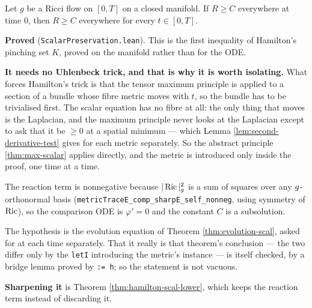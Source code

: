 \begin{theorem}
  \label{thm:scal-lower-bound-preserved}
  \leanok
  Let $g$ be a Ricci flow on $[0,T]$ on a closed manifold. If $R \ge C$ everywhere at
  time $0$, then $R \ge C$ everywhere for every $t \in [0,T]$.

  \textbf{Proved} (\texttt{ScalarPreservation.lean}). This is the first inequality of
  Hamilton's pinching set $K$, proved on the manifold rather than for the ODE.

  \textbf{It needs no Uhlenbeck trick, and that is why it is worth isolating.} What
  forces Hamilton's trick is that the tensor maximum principle is applied to a section
  of a bundle whose fibre metric moves with $t$, so the bundle has to be trivialised
  first. The scalar equation has no fibre at all: the only thing that moves is the
  Laplacian, and the maximum principle never looks at the Laplacian except to ask that
  it be $\ge 0$ at a spatial minimum --- which Lemma \ref{lem:second-derivative-test}
  gives for each metric separately. So the abstract principle
  \ref{thm:max-scalar} applies directly, and the metric is introduced only inside the
  proof, one time at a time.

  The reaction term is nonnegative because $|\operatorname{Ric}|^2_g$ is a sum of squares over any
  $g$-orthonormal basis (\texttt{metricTraceE\_comp\_sharpE\_self\_nonneg}, using
  symmetry of $\operatorname{Ric}$), so the comparison ODE is $\varphi' = 0$ and the constant $C$ is a
  subsolution.

  The hypothesis is the evolution equation of Theorem \ref{thm:evolution-scal}, asked
  for at each time separately. That it really is that theorem's conclusion --- the two
  differ only by the \texttt{letI} introducing the metric's instance --- is itself
  checked, by a bridge lemma proved by \texttt{:= h}; so the statement is not vacuous.

  \textbf{Sharpening it} is Theorem \ref{thm:hamilton-scal-lower}, which keeps the
  reaction term instead of discarding it.
\end{theorem}


